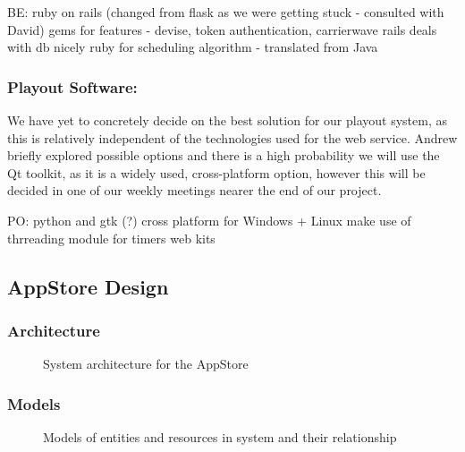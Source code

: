 \documentclass[a4paper, titlepage]{article}
\begin{document}
BE: 
  ruby on rails (changed from flask as we were getting stuck - consulted with David)
  gems for features - devise, token authentication, carrierwave
  rails deals with db nicely
  ruby for scheduling algorithm - translated from Java
  

\subsubsection{Playout Software: }

We have yet to concretely decide on the best solution for our playout system, as this is relatively independent of the technologies used for the web service. Andrew briefly explored possible options and there is a high probability we will use the Qt toolkit, as it is a widely used, cross-platform option, however this will be decided in one of our weekly meetings nearer the end of our project.

PO: 
  python and gtk (?)
  cross platform for Windows + Linux
  make use of thrreading module for timers
  web kits


\subsection{AppStore Design}


\subsubsection{Architecture}

\begin{figure}[ht]
  \centering
  \caption{System architecture for the AppStore}
  \label{fig:impl_models}
\end{figure}


\subsubsection{Models}

\begin{figure}[ht]
  \centering
  \caption{Models of entities and resources in system and their relationship}
  \label{fig:impl_models}
\end{figure}
\end{document}
